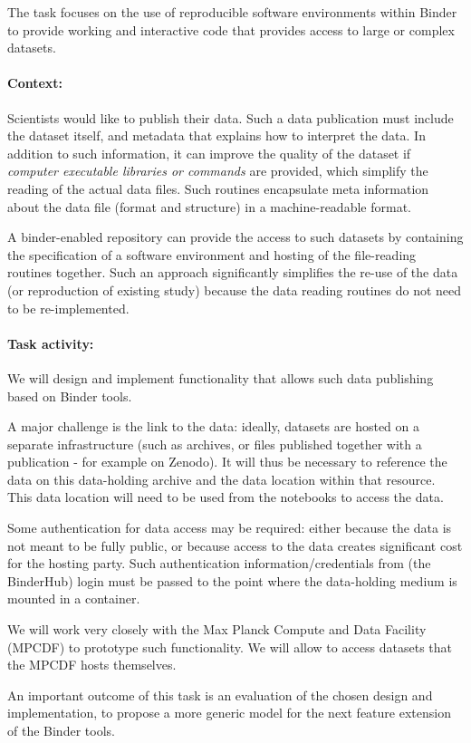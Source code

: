 \begin{task}[
  title=Data publishing,
  id=data-publishing,
  lead=MP,
  PM=8,
  partners={IFR,UIO}
  ]
  The task focuses on the use of reproducible software environments within
  Binder to provide working and interactive code that provides access to large
  or complex datasets.

  \paragraph*{Context:} Scientists would like to publish their data. Such a data
  publication must include the dataset itself, and metadata that explains how to
  interpret the data. In addition to such information, it can improve the
  quality of the dataset if \emph{computer executable libraries or commands}
  are provided, which simplify the reading of the actual data files. Such
  routines encapsulate meta information about the data file (format and
  structure) in a machine-readable format.

  A binder-enabled repository can provide the access to such datasets by
  containing the specification of a software environment and hosting of the
  file-reading routines together. Such an approach significantly simplifies the
  re-use of the data (or reproduction of existing study) because the data
  reading routines do not need to be re-implemented.

  \paragraph*{Task activity:}
  We will design and implement functionality that allows such data publishing
  based on Binder tools.

  A major challenge is the link to the data: ideally, datasets are hosted on a
  separate infrastructure (such as archives, or files published together with a
  publication - for example on Zenodo). It will thus be necessary to reference
  the data on this data-holding archive and the data location within that resource.
  This data location will need to be used from the notebooks to access
  the data. %

  Some authentication for data access may be required: either because the data
  is not meant to be fully public, or because access to the data creates
  significant cost for the hosting party. Such authentication
  information/credentials from (the BinderHub) login must be passed to the point
  where the data-holding medium is mounted in a container.

  We will work very closely with the Max Planck Compute and Data Facility
  (MPCDF) to prototype such functionality. We will allow to access datasets
  that the MPCDF hosts themselves.

  An important outcome of this task is an evaluation of the chosen design and
  implementation, to propose a more generic model for the next feature extension
  of the Binder tools.
\end{task}
